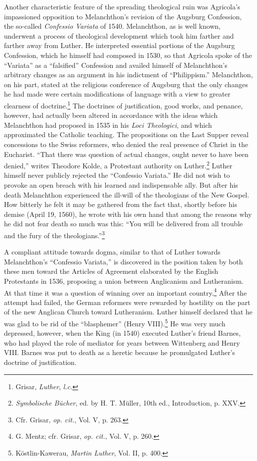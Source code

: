 Another characteristic feature of the spreading theological ruin
was Agricola’s impassioned opposition to Melanchthon’s revision of
the Augsburg Confession, the so-called \textit{Confessio Variata} of 1540.
Melanchthon, as is well known, underwent a process of theological
development which took him farther and farther away from Luther.
He interpreted essential portions of the Augsburg Confession, which
he himself had composed in 1530, so that Agricola spoke of the “Variata”
as a “falsified” Confession and availed himself of Melanchthon’s
arbitrary changes as an argument in his indictment of “Philippism.”
Melanchthon, on his part, stated at the religious conference of Augsburg
that the only changes he had made were certain modifications
of language with a view to greater clearness of doctrine.\footnote{Grisar, \textit{Luther}, \textit{l.c.}}
 The doctrines
of justification, good works, and penance, however, had actually been
altered in accordance with the ideas which Melanchthon
had proposed in 1535 in his \textit{Loci Theologici}, and which approximated
the Catholic teaching. The propositions on the Last Supper reveal
concessions to the Swiss reformers, who denied the real presence of
Christ in the Eucharist. “That there was question of actual changes,
ought never to have been denied,” writes Theodore Kolde, a Protestant
authority on Luther.\footnote{\textit{Symbolische Bücher}, ed. by H. T. Müller, 10th ed., Introduction, p. XXV.}
Luther himself never publicly rejected
the “Confessio Variata.” He did not wish to provoke an open breach
with his learned and indispensable ally. But after his death Melanchthon
experienced the ill-will of the theologians of the New Gospel.
How bitterly he felt it may be gathered from the fact that, shortly
before his demise (April 19, 1560), he wrote with his own hand that
among the reasons why he did not fear death so much was this: “You
will be delivered from all trouble and the fury of the theologians.”\footnote{Cfr. Grisar, \textit{op. cit.}, Vol. V, p. 263.}

A compliant attitude towards dogma, similar to that of Luther
towards Melanchthon’s “Confessio Variata,” is discovered in the position
taken by both these men toward the Articles of Agreement
elaborated by the English Protestants in 1536, proposing a union between
Anglicanism and Lutheranism. At that time it was a question
of winning over an important country.\footnote{G. Mentz; cfr. Grisar, \textit{op. cit.}, Vol. V, p. 260.}
 After the attempt had
failed, the German reformers were rewarded by hostility on the part
of the new Anglican Church toward Lutheranism. Luther himself
declared that he was glad to be rid of the “blasphemer” (Henry
VIII).\footnote{Köstlin-Kawerau, \textit{Martin Luther}, Vol. II, p. 400.}
 He was very much depressed, however, when the King (in
1540) executed Luther’s friend Barnes, who had played the role of
mediator for years between Wittenberg and Henry VIII. Barnes was
put to death as a heretic because he promulgated Luther’s doctrine
of justification.

